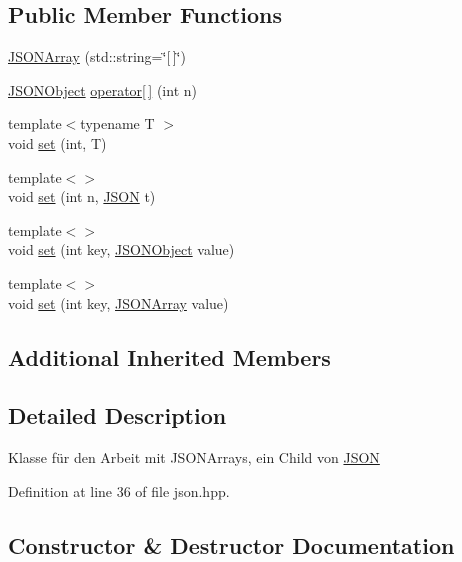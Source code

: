 \subsection*{Public Member Functions}
\begin{DoxyCompactItemize}
\item 
\mbox{\hyperlink{class_j_s_o_n_array_ac7403c8a053c8dcc205ae8f4b6953cc8}{J\+S\+O\+N\+Array}} (std\+::string=\char`\"{}\mbox{[}$\,$\mbox{]}\char`\"{})
\item 
\mbox{\hyperlink{class_j_s_o_n_object}{J\+S\+O\+N\+Object}} \mbox{\hyperlink{class_j_s_o_n_array_a8c2bac974ee9b2806e9dbb78062f3abd}{operator\mbox{[}$\,$\mbox{]}}} (int n)
\item 
{\footnotesize template$<$typename T $>$ }\\void \mbox{\hyperlink{class_j_s_o_n_array_ad012cef04a71b2e708d28f88f3c1c4e7}{set}} (int, T)
\item 
{\footnotesize template$<$$>$ }\\void \mbox{\hyperlink{class_j_s_o_n_array_a40043037244507bd344c9cae26962bde}{set}} (int n, \mbox{\hyperlink{class_j_s_o_n}{J\+S\+ON}} t)
\item 
{\footnotesize template$<$$>$ }\\void \mbox{\hyperlink{class_j_s_o_n_array_a6cbff0aa889890a84af41d6f5eae23f2}{set}} (int key, \mbox{\hyperlink{class_j_s_o_n_object}{J\+S\+O\+N\+Object}} value)
\item 
{\footnotesize template$<$$>$ }\\void \mbox{\hyperlink{class_j_s_o_n_array_adabcf6ff104db56de01192e17f488aed}{set}} (int key, \mbox{\hyperlink{class_j_s_o_n_array}{J\+S\+O\+N\+Array}} value)
\end{DoxyCompactItemize}
\subsection*{Additional Inherited Members}


\subsection{Detailed Description}
Klasse für den Arbeit mit J\+S\+O\+N\+Arrays, ein Child von \mbox{\hyperlink{class_j_s_o_n}{J\+S\+ON}} 

Definition at line 36 of file json.\+hpp.



\subsection{Constructor \& Destructor Documentation}
\mbox{\label{class_j_s_o_n_array_ac7403c8a053c8dcc205ae8f4b6953cc8}} 
